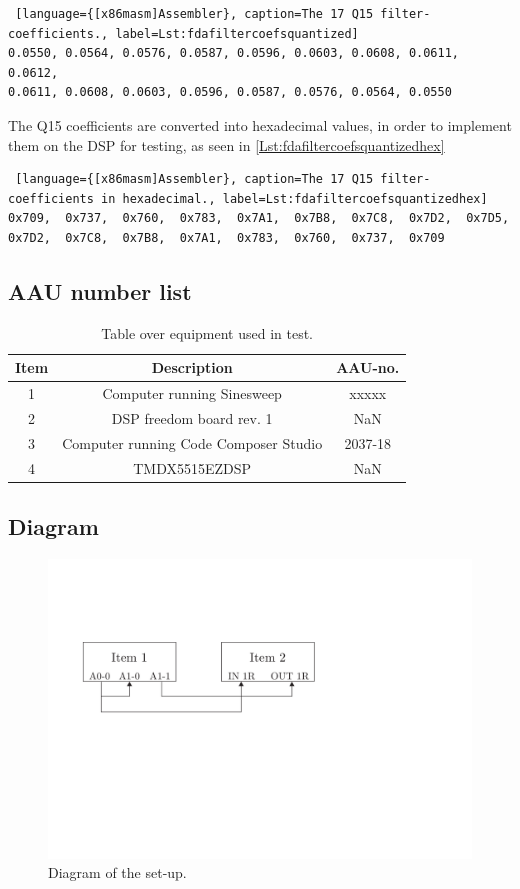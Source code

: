 \begin{lstlisting} [language={[x86masm]Assembler}, caption=The 17 Q15 filter-coefficients., label=Lst:fdafiltercoefsquantized]
0.0550,	0.0564,	0.0576,	0.0587,	0.0596,	0.0603,	0.0608,	0.0611,	0.0612,
0.0611,	0.0608,	0.0603,	0.0596,	0.0587,	0.0576,	0.0564,	0.0550
\end{lstlisting}

The Q15 coefficients are converted into hexadecimal values, in order to implement them on the DSP for testing, as seen in \autoref{Lst:fdafiltercoefsquantizedhex} 

\begin{lstlisting} [language={[x86masm]Assembler}, caption=The 17 Q15 filter-coefficients in hexadecimal., label=Lst:fdafiltercoefsquantizedhex]
0x709,	0x737,	0x760,	0x783,	0x7A1,	0x7B8,	0x7C8,	0x7D2,	0x7D5,
0x7D2,	0x7C8,	0x7B8,	0x7A1,	0x783,	0x760,	0x737,	0x709
\end{lstlisting}


\subsection{AAU number list}
\begin{table}[H]
	\centering
	\begin{tabular}{ c c c } \toprule
	{Item}	& {Description} 						& {AAU-no}. \\ \bottomrule 
	1	&	Computer running Sinesweep	& xxxxx	\\
	2	&	DSP freedom board rev. 1 	& NaN		\\
	3	&	Computer running Code Composer Studio		& 2037-18		\\
	4	&	TMDX5515EZDSP					& NaN		\\
	\bottomrule
	\end{tabular}
	\caption{Table over equipment used in test.}
	\label{tab:UsedEquipmentListningFIRTest}
\end{table}

\subsection{Diagram}
\begin{figure}[H]
	\centering
	\includegraphics{../Journal/Experiments/Figures/FIRFilterTestSetup}
	\caption{Diagram of the set-up.}
	\label{Fig:FIRSetupDiagram}
\end{figure}


